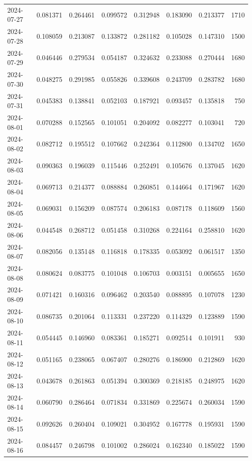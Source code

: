 \begin{tabular}{lrrrrrrr}
2024-07-27 & 0.081371 & 0.264461 & 0.099572 & 0.312948 & 0.183090 & 0.213377 & 1710 \\
2024-07-28 & 0.108059 & 0.213087 & 0.133872 & 0.281182 & 0.105028 & 0.147310 & 1500 \\
2024-07-29 & 0.046446 & 0.279534 & 0.054187 & 0.324632 & 0.233088 & 0.270444 & 1680 \\
2024-07-30 & 0.048275 & 0.291985 & 0.055826 & 0.339608 & 0.243709 & 0.283782 & 1680 \\
2024-07-31 & 0.045383 & 0.138841 & 0.052103 & 0.187921 & 0.093457 & 0.135818 & 750 \\
2024-08-01 & 0.070288 & 0.152565 & 0.101051 & 0.204092 & 0.082277 & 0.103041 & 720 \\
2024-08-02 & 0.082712 & 0.195512 & 0.107662 & 0.242364 & 0.112800 & 0.134702 & 1650 \\
2024-08-03 & 0.090363 & 0.196039 & 0.115446 & 0.252491 & 0.105676 & 0.137045 & 1620 \\
2024-08-04 & 0.069713 & 0.214377 & 0.088884 & 0.260851 & 0.144664 & 0.171967 & 1620 \\
2024-08-05 & 0.069031 & 0.156209 & 0.087574 & 0.206183 & 0.087178 & 0.118609 & 1560 \\
2024-08-06 & 0.044548 & 0.268712 & 0.051458 & 0.310268 & 0.224164 & 0.258810 & 1620 \\
2024-08-07 & 0.082056 & 0.135148 & 0.116818 & 0.178335 & 0.053092 & 0.061517 & 1350 \\
2024-08-08 & 0.080624 & 0.083775 & 0.101048 & 0.106703 & 0.003151 & 0.005655 & 1650 \\
2024-08-09 & 0.071421 & 0.160316 & 0.096462 & 0.203540 & 0.088895 & 0.107078 & 1230 \\
2024-08-10 & 0.086735 & 0.201064 & 0.113331 & 0.237220 & 0.114329 & 0.123889 & 1590 \\
2024-08-11 & 0.054445 & 0.146960 & 0.083361 & 0.185271 & 0.092514 & 0.101911 & 930 \\
2024-08-12 & 0.051165 & 0.238065 & 0.067407 & 0.280276 & 0.186900 & 0.212869 & 1620 \\
2024-08-13 & 0.043678 & 0.261863 & 0.051394 & 0.300369 & 0.218185 & 0.248975 & 1620 \\
2024-08-14 & 0.060790 & 0.286464 & 0.071834 & 0.331869 & 0.225674 & 0.260034 & 1590 \\
2024-08-15 & 0.092626 & 0.260404 & 0.109021 & 0.304952 & 0.167778 & 0.195931 & 1590 \\
2024-08-16 & 0.084457 & 0.246798 & 0.101002 & 0.286024 & 0.162340 & 0.185022 & 1590 \\

\end{tabular}
